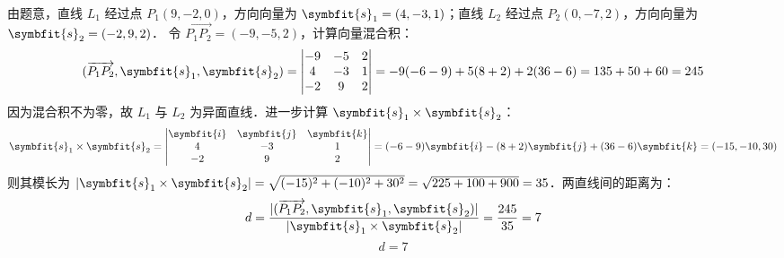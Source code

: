 \begin{solution}
    由题意，直线 $L_1$ 经过点 $P_1(9, -2, 0)$，方向向量为 $\symbfit{s}_1 = (4, -3, 1)$；直线 $L_2$ 经过点 $P_2(0, -7, 2)$，方向向量为 $\symbfit{s}_2 = (-2, 9, 2)$．
    令 $\overrightarrow{P_1P_2} = (-9, -5, 2)$，计算向量混合积：
    \begin{equation}
        (\overrightarrow{P_1P_2}, \symbfit{s}_1, \symbfit{s}_2) = \begin{vmatrix} -9 & -5 & 2 \\ 4 & -3 & 1 \\ -2 & 9 & 2 \end{vmatrix} = -9(-6 - 9) + 5(8 + 2) + 2(36 - 6) = 135 + 50 + 60 = 245
    \end{equation}
    因为混合积不为零，故 $L_1$ 与 $L_2$ 为异面直线．进一步计算 $\symbfit{s}_1 \times \symbfit{s}_2$：
    \begin{equation}
        \symbfit{s}_1 \times \symbfit{s}_2 = \begin{vmatrix} \symbfit{i} & \symbfit{j} & \symbfit{k} \\ 4 & -3 & 1 \\ -2 & 9 & 2 \end{vmatrix} = (-6 - 9)\symbfit{i} - (8 + 2)\symbfit{j} + (36 - 6)\symbfit{k} = (-15, -10, 30)
    \end{equation}
    则其模长为 $|\symbfit{s}_1 \times \symbfit{s}_2| = \sqrt{(-15)^2 + (-10)^2 + 30^2} = \sqrt{225 + 100 + 900} = 35$．两直线间的距离为：
    \begin{equation}
        d = \frac{|(\overrightarrow{P_1P_2}, \symbfit{s}_1, \symbfit{s}_2)|}{|\symbfit{s}_1 \times \symbfit{s}_2|} = \frac{245}{35} = 7
    \end{equation}
    \begin{equation}
        \boxed{d = 7}
    \end{equation}


\end{solution}
